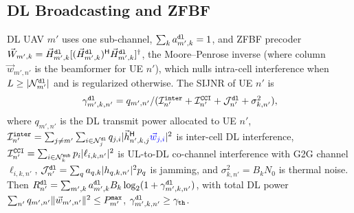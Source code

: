 \documentclass[journal]{IEEEtran}
\begin{document}
\subsection{DL Broadcasting and ZFBF}
\label{sec:dl}
DL UAV $m'$ uses one sub-channel, $\sum_k a_{m',k}^{\tt dl}=1$, and ZFBF precoder $\vec{W}_{m',k}=\vec{H}_{m',k}^{\tt dl}[(\vec{H}_{m',k}^{\tt dl})^{\sf H}\vec{H}_{m',k}^{\tt dl}]^{\dagger}$, the Moore--Penrose inverse {\color{blue}(where column $\vec{w}_{m',n'}$ is the beamformer for UE $n'$)}, which nulls intra-cell interference when $L\ge|\mathcal{N}_{m'}^{\tt dl}|$ and is regularized otherwise. The SIJNR of UE $n'$ is
\begin{equation}
\textstyle\gamma_{m',k,n'}^{\tt dl}=q_{m',n'}/(\mathcal{I}_{n'}^{\tt inter}+\mathcal{I}_{n'}^{\tt CCI}+\mathcal{J}_{n'}^{\tt dl}+\sigma_{k,n'}^2),
\label{eq:dl_sijnr}
\end{equation}
where {\color{blue}$q_{m',n'}$ is the DL transmit power allocated to UE $n'$}, $\mathcal{I}_{n'}^{\tt inter}=\sum_{j\neq m'}\sum_{i\in\mathcal{N}_j^{\tt dl}}q_{j,i}|\vec{h}_{n',k,j}^{\sf H}{\color{blue}\vec{w}_{j,i}}|^2$ is inter-cell DL interference,
$\mathcal{I}_{n'}^{\tt CCI}=\sum_{i\in\mathcal{N}_k^{\tt sub}}p_i|\ell_{i,k,n'}|^2$ is UL-to-DL co-channel interference with G2G channel $\ell_{i,k,n'}$,
$\mathcal{J}_{n'}^{\tt dl}=\sum_{q}a_{q,k}|h_{q,k,n'}|^2 p_q$ is jamming, and
$\sigma_{k,n'}^2=B_k N_0$ is thermal noise.
Then $R_{n'}^{\tt dl}=\sum_{m',k}a_{m',k}^{\tt dl}B_k\log_2(1+\gamma_{m',k,n'}^{\tt dl})$, with total DL power $\sum_{n'}q_{m',n'}\Vert\vec{w}_{m',n'}\Vert^2\le P_{m'}^{\tt max}$, $\gamma_{m',k,n'}^{\tt dl}\ge\gamma_{\tt th}$.
\end{document}
